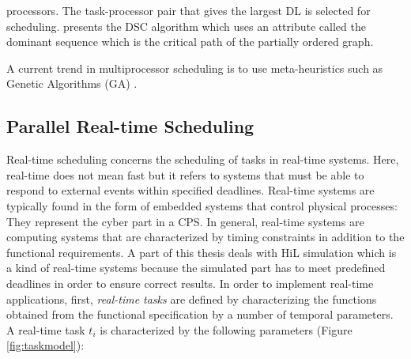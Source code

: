 processors. The task-processor pair that gives the largest DL is selected for scheduling. \cite{yang:1994} presents the DSC algorithm which uses an attribute called the dominant sequence which is the critical path of the partially ordered graph.

A current trend in multiprocessor scheduling is to use meta-heuristics such as Genetic Algorithms (GA) \cite{hou:1994, wu:2004, omara:2010}.

\subsection{Parallel Real-time Scheduling}

Real-time scheduling concerns the scheduling of tasks in real-time systems. Here, real-time does not mean fast but it refers to systems that must be able to respond to external events within specified deadlines. Real-time systems are typically found in the form of embedded systems that control physical processes: They represent the cyber part in a CPS. In general, real-time systems are computing systems that are characterized by timing constraints in addition to the functional requirements. A part of this thesis deals with HiL simulation which is a kind of real-time systems because the simulated part has to meet predefined deadlines in order to ensure correct results.
In order to implement real-time applications, first, \textit{real-time tasks} are defined by characterizing the functions obtained from the functional specification by a number of temporal parameters. A real-time task $t_i$ is characterized by the following parameters (Figure \ref{fig:taskmodel}):
